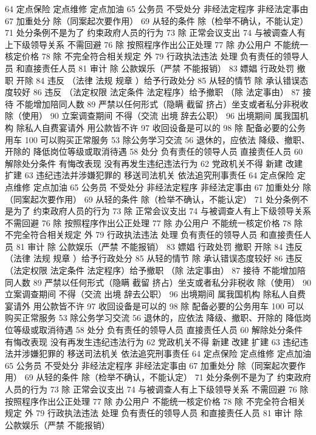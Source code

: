 \documentclass[11pt]{ctexart}
\begin{document}
64 定点保险 定点维修 定点加油
65 公务员 不受处分
非经法定程序
非经法定事由
67 加重处分
除（同案起次要作用）
69 从轻的条件
除（检举不确认，不能认定）
71 处分条例不是为了
约束政府人员的行为
73 除 正常会议支出
74 与被调查人有上下级领导关系 不需回避
76 除 按照程序作出公正处理
77 除 办公用户
不能统一核定价格
78 除 不完全符合相关规定 外
79 行政执法违法 处理
负有责任的领导人员
和直接责任人员
81 审计
除 公款娱乐（严禁 不能报销）
83 嫖娼 行政处罚
撤职 开除
84 违反 （法律 法规 规章 ）给予行政处分
85 从轻的情节
除 承认错误态度较好
86 违反 （法定权限 法定条件 法定程序）给予撤职
（除 法定事由）
87 接待 不能增加陪同人数
89 严禁以任何形式（隐瞒 截留 挤占）坐支或者私分非税收
除（使用）
90 立案调查期间 不得（交流 出境 辞去公职）
96 出境期间 属我国机构 除私人自费宴请外 用公款皆不许
97 收回设备是可以的
98 除 配备必要的公务用车
100 可以购买正常服务
53 除公务学习交流
56 退休的，应依法
降级、撤职、开除的 降低岗位等级或取消待遇
58 处分
负有责任的领导人员
直接责任人员
60 解除处分条件
有悔改表现
没有再发生违纪违法行为
62 党政机关不得
新建 改建 扩建
63 违纪违法并涉嫌犯罪的
移送司法机关
依法追究刑事责任
64 定点保险 定点维修 定点加油
65 公务员 不受处分
非经法定程序
非经法定事由
67 加重处分
除（同案起次要作用）
69 从轻的条件
除（检举不确认，不能认定）
71 处分条例不是为了
约束政府人员的行为
73 除 正常会议支出
74 与被调查人有上下级领导关系 不需回避
76 除 按照程序作出公正处理
77 除 办公用户
不能统一核定价格
78 除 不完全符合相关规定 外
79 行政执法违法 处理
负有责任的领导人员
和直接责任人员
81 审计
除 公款娱乐（严禁 不能报销）
83 嫖娼 行政处罚
撤职 开除
84 违反 （法律 法规 规章 ）给予行政处分
85 从轻的情节
除 承认错误态度较好
86 违反 （法定权限 法定条件 法定程序）给予撤职
（除 法定事由）
87 接待 不能增加陪同人数
89 严禁以任何形式（隐瞒 截留 挤占）坐支或者私分非税收
除（使用）
90 立案调查期间 不得（交流 出境 辞去公职）
96 出境期间 属我国机构 除私人自费宴请外 用公款皆不许
97 收回设备是可以的
98 除 配备必要的公务用车
100 可以购买正常服务
53 除公务学习交流
56 退休的，应依法
降级、撤职、开除的 降低岗位等级或取消待遇
58 处分
负有责任的领导人员
直接责任人员
60 解除处分条件
有悔改表现
没有再发生违纪违法行为
62 党政机关不得
新建 改建 扩建
63 违纪违法并涉嫌犯罪的
移送司法机关
依法追究刑事责任
64 定点保险 定点维修 定点加油
65 公务员 不受处分
非经法定程序
非经法定事由
67 加重处分
除（同案起次要作用）
69 从轻的条件
除（检举不确认，不能认定）
71 处分条例不是为了
约束政府人员的行为
73 除 正常会议支出
74 与被调查人有上下级领导关系 不需回避
76 除 按照程序作出公正处理
77 除 办公用户
不能统一核定价格
78 除 不完全符合相关规定 外
79 行政执法违法 处理
负有责任的领导人员
和直接责任人员
81 审计
除 公款娱乐（严禁 不能报销）
\end{document}
